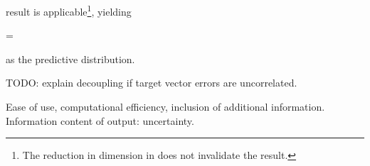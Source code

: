     result  is applicable\footnote{The reduction in
    dimension in  does not invalidate the result.},
    yielding

    \startformula
        \RPREDICT = 
    \stopformula

    as the predictive distribution.

    TODO: explain decoupling if target vector errors are uncorrelated.

\stopsection


\startsection[title=Comparison of Techniques]

    Ease of use, computational efficiency, inclusion of additional information.
    Information content of output: uncertainty.

\stopsection

